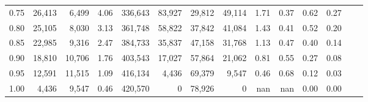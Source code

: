 \begin{tabular}{rrrrrrrrrrrrrr}
0.75 &  26,413 &   6,499 &    4.06 &  336,643 &   83,927 &  29,812 &  49,114 &  1.71 &  0.37 &  0.62 &      0.27 \\
0.80 &  25,105 &   8,030 &    3.13 &  361,748 &   58,822 &  37,842 &  41,084 &  1.43 &  0.41 &  0.52 &      0.20 \\
0.85 &  22,985 &   9,316 &    2.47 &  384,733 &   35,837 &  47,158 &  31,768 &  1.13 &  0.47 &  0.40 &      0.14 \\
0.90 &  18,810 &  10,706 &    1.76 &  403,543 &   17,027 &  57,864 &  21,062 &  0.81 &  0.55 &  0.27 &      0.08 \\
0.95 &  12,591 &  11,515 &    1.09 &  416,134 &    4,436 &  69,379 &   9,547 &  0.46 &  0.68 &  0.12 &      0.03 \\
1.00 &   4,436 &   9,547 &    0.46 &  420,570 &        0 &  78,926 &       0 &   nan &   nan &  0.00 &      0.00 \\
\bottomrule
\end{tabular}
